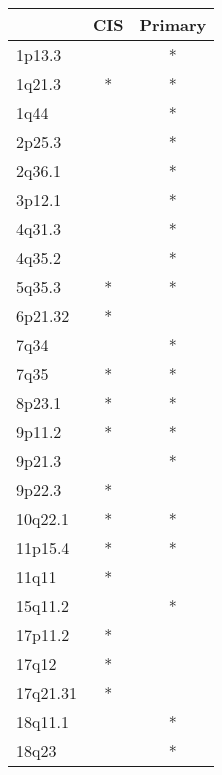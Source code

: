 \begin{tabular}{lcc}
\toprule
{} & CIS & Primary \\
\midrule
1p13.3   &     &       * \\
1q21.3   &   * &       * \\
1q44     &     &       * \\
2p25.3   &     &       * \\
2q36.1   &     &       * \\
3p12.1   &     &       * \\
4q31.3   &     &       * \\
4q35.2   &     &       * \\
5q35.3   &   * &       * \\
6p21.32  &   * &         \\
7q34     &     &       * \\
7q35     &   * &       * \\
8p23.1   &   * &       * \\
9p11.2   &   * &       * \\
9p21.3   &     &       * \\
9p22.3   &   * &         \\
10q22.1  &   * &       * \\
11p15.4  &   * &       * \\
11q11    &   * &         \\
15q11.2  &     &       * \\
17p11.2  &   * &         \\
17q12    &   * &         \\
17q21.31 &   * &         \\
18q11.1  &     &       * \\
18q23    &     &       * \\
\bottomrule
\end{tabular}
